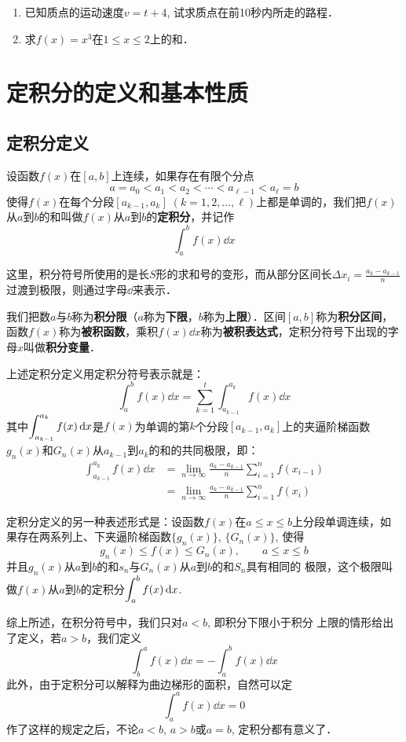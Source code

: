 \begin{ex}
\begin{enumerate}
    \item 已知质点的运动速度$v=t+4$, 试求质点在前10秒内所走的路程．
    \item 求$f(x)=x^3$在$1\le x\le 2$上的和．
\end{enumerate}
\end{ex}


\section{定积分的定义和基本性质}
\subsection{定积分定义}

设函数$f(x)$在$[a,b]$上连续，如果存在有限个分点
\[a=a_0<a_1<a_2<\cdots<a_{\ell-1}<a_{\ell}=b\]
使得$f(x)$在每个分段$[a_{k-1},a_k]\; (k=1, 2,\ldots,\ell)$上都是单调的，我们把$f(x)$从$a$到$b$的和叫做$f(x)$从$a$到$b$的\textbf{定积分}，并记作
\[\int^b_a f(x) \dd x\]

这里，积分符号所使用的是长$S$形的求和号的变形，而从部分区间长$\Delta x_i=\frac{a_k-a_{k-1}}{n}$过渡到极限，则通过字母$\dd$来表示．

我们把数$a$与$b$称为\textbf{积分限}（$a$称为\textbf{下限}，$b$称为\textbf{上限}）．区间$[a,b]$称为\textbf{积分区间}，函数$f(x)$称为\textbf{被积函数}，乘积$f(x)\dd x$称为\textbf{被积表达式}，定积分符号下出现的字母$x$叫做\textbf{积分变量}．

上述定积分定义用定积分符号表示就是：
\[\int^b_a f(x) \dd x=\sum^t_{k=1}\int^{a_k}_{a_{k-1}}f(x)\dd x\]
其中$\displaystyle\int^{a_k}_{a_{k-1}}f(x)\,{\rm d} x$是$f(x)$为单调的第$k$个分段$[a_{k-1},a_k]$上的夹逼阶梯函数$g_n(x)$和$G_n(x)$从$a_{k-1}$到$a_k$的和的共同极限，即：
\[\begin{split}
    \int^{a_k}_{a_{k-1}}f(x)\dd x&=\lim_{n\to \infty}\frac{a_k-a_{k-1}}{n}\sum^n_{i=1}f(x_{i-1})\\
    &=\lim_{n\to \infty}\frac{a_k-a_{k-1}}{n}\sum^n_{i=1}f(x_{i})
\end{split}\]

定积分定义的另一种表述形式是：设函数$f(x)$在$a\le x\le b$上分段单调连续，如果存在两系列上、下夹逼阶梯函数$\{g_n(x)\}$, $\{G_n(x)\}$, 使得
\[g_n (x)\le f(x)\le G_n(x),\qquad a\le x\le b\]
并且$g_n(x)$从$a$到$b$的和$s_n$与$G_n(x)$从$a$到$b$的和$S_n$具有相同的
极限，这个极限叫做$f(x)$从$a$到$b$的定积分$\displaystyle\int^b_a f(x) \,{\rm d} x$.

综上所述，在积分符号中，我们只对$a<b$, 即积分下限小于积分
上限的情形给出了定义，若$a>b$，我们定义
\[\int^a_b f(x) \dd x=-\int^b_a f(x) \dd x\]
此外，由于定积分可以解释为曲边梯形的面积，自然可以定
\[\int^a_a f(x) \dd x=0\]
作了这样的规定之后，不论$a<b$, $a>b$或$a=b$, 定积分都有意义了．


